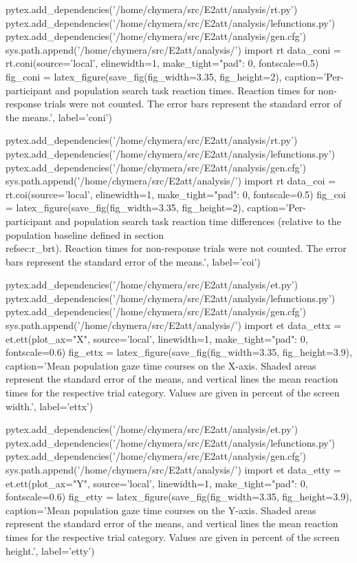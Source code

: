 \begin{pycode}[coni]
pytex.add_dependencies('/home/chymera/src/E2att/analysis/rt.py')
pytex.add_dependencies('/home/chymera/src/E2att/analysis/lefunctions.py')
pytex.add_dependencies('/home/chymera/src/E2att/analysis/gen.cfg')
sys.path.append('/home/chymera/src/E2att/analysis/')
import rt
data_coni = rt.coni(source='local', elinewidth=1, make_tight={"pad": 0}, fontscale=0.5)
fig_coni = latex_figure(save_fig(fig_width=3.35, fig_height=2), caption='Per-participant and population search task reaction times. Reaction times for non-response trials were not counted. The error bars represent the standard error of the means.', label='coni')
\end{pycode}
\begin{pycode}[coi]
pytex.add_dependencies('/home/chymera/src/E2att/analysis/rt.py')
pytex.add_dependencies('/home/chymera/src/E2att/analysis/lefunctions.py')
pytex.add_dependencies('/home/chymera/src/E2att/analysis/gen.cfg')
sys.path.append('/home/chymera/src/E2att/analysis/')
import rt
data_coi = rt.coi(source='local', elinewidth=1, make_tight={"pad": 0}, fontscale=0.5)
fig_coi = latex_figure(save_fig(fig_width=3.35, fig_height=2), caption='Per-participant and population search task reaction time differences (relative to the population baseline defined in section~\\ref{sec:r_brt}). Reaction times for non-response trials were not counted. The error bars represent the standard error of the means.', label='coi')
\end{pycode}
\begin{pycode}[ettx]
pytex.add_dependencies('/home/chymera/src/E2att/analysis/et.py')
pytex.add_dependencies('/home/chymera/src/E2att/analysis/lefunctions.py')
pytex.add_dependencies('/home/chymera/src/E2att/analysis/gen.cfg')
sys.path.append('/home/chymera/src/E2att/analysis/')
import et
data_ettx = et.ett(plot_ax="X", source='local', linewidth=1, make_tight={"pad": 0}, fontscale=0.6)
fig_ettx = latex_figure(save_fig(fig_width=3.35, fig_height=3.9), caption='Mean population gaze time courses on the X-axis. Shaded areas represent the standard error of the means, and vertical lines the mean reaction times for the respective trial category. Values are given in percent of the screen width.', label='ettx')
\end{pycode}
\begin{pycode}[etty]
pytex.add_dependencies('/home/chymera/src/E2att/analysis/et.py')
pytex.add_dependencies('/home/chymera/src/E2att/analysis/lefunctions.py')
pytex.add_dependencies('/home/chymera/src/E2att/analysis/gen.cfg')
sys.path.append('/home/chymera/src/E2att/analysis/')
import et
data_etty = et.ett(plot_ax="Y", source='local', linewidth=1, make_tight={"pad": 0}, fontscale=0.6)
fig_etty = latex_figure(save_fig(fig_width=3.35, fig_height=3.9), caption='Mean population gaze time courses on the Y-axis. Shaded areas represent the standard error of the means, and vertical lines the mean reaction times for the respective trial category. Values are given in percent of the screen height.', label='etty')
\end{pycode}


